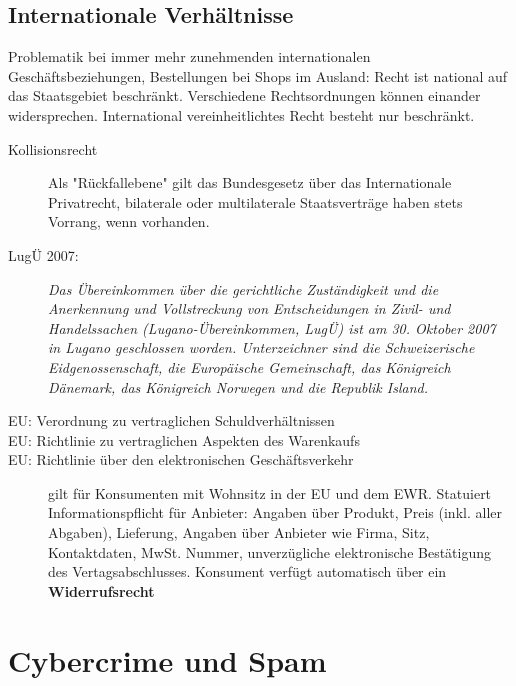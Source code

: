 \subsection{Internationale Verhältnisse}

Problematik bei immer mehr zunehmenden internationalen Geschäftsbeziehungen, Bestellungen bei Shops im Ausland:
Recht ist national auf das Staatsgebiet beschränkt. Verschiedene Rechtsordnungen können einander widersprechen. International vereinheitlichtes Recht besteht nur beschränkt.

\begin{description}
  \item[Kollisionsrecht] Als "Rückfallebene" gilt das Bundesgesetz über das Internationale Privatrecht, bilaterale oder multilaterale Staatsverträge haben stets Vorrang, wenn vorhanden. 
  \item[LugÜ 2007:]
  \textit{
    Das Übereinkommen über die gerichtliche Zuständigkeit und die Anerkennung und Vollstreckung von Entscheidungen in Zivil- und Handelssachen (Lugano-Übereinkommen, LugÜ) ist am 30. Oktober 2007 in Lugano geschlossen worden. Unterzeichner sind die Schweizerische Eidgenossenschaft, die Europäische Gemeinschaft, das Königreich Dänemark, das Königreich Norwegen und die Republik Island.}
    \item[EU: Verordnung zu vertraglichen Schuldverhältnissen]
    \item[EU: Richtlinie zu vertraglichen Aspekten des Warenkaufs]
    \item[EU: Richtlinie über den elektronischen Geschäftsverkehr] gilt für Konsumenten mit Wohnsitz in der EU und dem EWR. Statuiert Informationspflicht für Anbieter: Angaben über Produkt, Preis (inkl. aller Abgaben), Lieferung, Angaben über Anbieter wie Firma, Sitz, Kontaktdaten, MwSt. Nummer, unverzügliche elektronische Bestätigung des Vertagsabschlusses. Konsument verfügt automatisch über ein \textbf{Widerrufsrecht}
  \end{description}
    
\section{Cybercrime und Spam}

